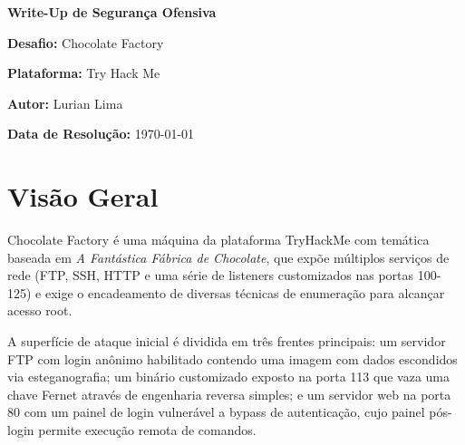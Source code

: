 \documentclass[12pt]{article} %
\begin{document}
\begin{titlepage}
    \centering
    \vspace*{2cm}
    {\Huge \textbf{Write-Up de Segurança Ofensiva} \par}
    \vspace{1.5cm}
    {\Large \textbf{Desafio:} Chocolate Factory \par}
    {\large \textbf{Plataforma:} Try Hack Me \par}
    {\large \textbf{Autor:} Lurian Lima \par}
    \vspace{2cm}
    {\large \textbf{Data de Resolução:} \today \par}
    \vfill
\end{titlepage}

\tableofcontents
\newpage



\section{Visão Geral}

Chocolate Factory é uma máquina da plataforma TryHackMe com temática baseada em \textit{A Fantástica Fábrica de Chocolate}, que expõe múltiplos serviços de rede (FTP, SSH, HTTP e uma série de listeners customizados nas portas 100-125) e exige o encadeamento de diversas técnicas de enumeração para alcançar acesso root.

A superfície de ataque inicial é dividida em três frentes principais: um servidor FTP com login anônimo habilitado contendo uma imagem com dados escondidos via esteganografia; um binário customizado exposto na porta 113 que vaza uma chave Fernet através de engenharia reversa simples; e um servidor web na porta 80 com um painel de login vulnerável a bypass de autenticação, cujo painel pós-login permite execução remota de comandos.
\end{document}
